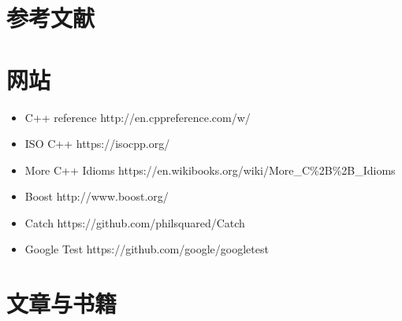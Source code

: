 
\section*{参考文献}



\section*{网站}



\begin{itemize}
\item C++ reference http://\allowbreak{}en.\allowbreak{}cppreference.\allowbreak{}com/\allowbreak{}w/



\item ISO C++ https://\allowbreak{}isocpp.\allowbreak{}org/



\item More C++ Idioms https://\allowbreak{}en.\allowbreak{}wikibooks.\allowbreak{}org/\allowbreak{}wiki/\allowbreak{}More\_\allowbreak{}C\%2B\%2B\_\allowbreak{}Idioms



\item Boost http://\allowbreak{}www.\allowbreak{}boost.\allowbreak{}org/



\item Catch https://\allowbreak{}github.\allowbreak{}com/\allowbreak{}philsquared/\allowbreak{}Catch



\item Google Test https://\allowbreak{}github.\allowbreak{}com/\allowbreak{}google/\allowbreak{}googletest

\end{itemize}



\section*{文章与书籍}



